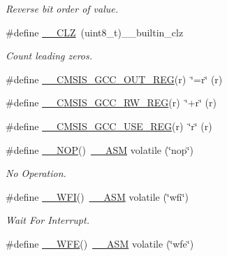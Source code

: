 \begin{DoxyCompactItemize}
\begin{DoxyCompactList}\small\item\em Reverse bit order of value. \end{DoxyCompactList}\item 
\#define \mbox{\hyperlink{group___c_m_s_i_s___core___instruction_interface_ga5d5bb1527e042be4a9fa5a33f65cc248}{\+\_\+\+\_\+\+C\+LZ}}~(uint8\+\_\+t)\+\_\+\+\_\+builtin\+\_\+clz
\begin{DoxyCompactList}\small\item\em Count leading zeros. \end{DoxyCompactList}\item 
\#define \mbox{\hyperlink{group___c_m_s_i_s___core___instruction_interface_gabc17e391c13c71702366c67cba39c276}{\+\_\+\+\_\+\+C\+M\+S\+I\+S\+\_\+\+G\+C\+C\+\_\+\+O\+U\+T\+\_\+\+R\+EG}}(r)~\char`\"{}=r\char`\"{} (r)
\item 
\#define \mbox{\hyperlink{group___c_m_s_i_s___core___instruction_interface_ga03179f79efee45c226dddfb8d824ad83}{\+\_\+\+\_\+\+C\+M\+S\+I\+S\+\_\+\+G\+C\+C\+\_\+\+R\+W\+\_\+\+R\+EG}}(r)~\char`\"{}+r\char`\"{} (r)
\item 
\#define \mbox{\hyperlink{group___c_m_s_i_s___core___instruction_interface_ga9d94dee7402367961d2cf0accc00fd97}{\+\_\+\+\_\+\+C\+M\+S\+I\+S\+\_\+\+G\+C\+C\+\_\+\+U\+S\+E\+\_\+\+R\+EG}}(r)~\char`\"{}r\char`\"{} (r)
\item 
\#define \mbox{\hyperlink{group___c_m_s_i_s___core___instruction_interface_ga0b13f3617dd4af2cd2eb3a311073f717}{\+\_\+\+\_\+\+N\+OP}}()~\mbox{\hyperlink{cmsis__iccarm_8h_a1378040bcf22428955c6e3ce9c2053cd}{\+\_\+\+\_\+\+A\+SM}} volatile (\char`\"{}nop\char`\"{})
\begin{DoxyCompactList}\small\item\em No Operation. \end{DoxyCompactList}\item 
\#define \mbox{\hyperlink{group___c_m_s_i_s___core___instruction_interface_gab28e2b328c4cf23c917ab18a23194f8e}{\+\_\+\+\_\+\+W\+FI}}()~\mbox{\hyperlink{cmsis__iccarm_8h_a1378040bcf22428955c6e3ce9c2053cd}{\+\_\+\+\_\+\+A\+SM}} volatile (\char`\"{}wfi\char`\"{})
\begin{DoxyCompactList}\small\item\em Wait For Interrupt. \end{DoxyCompactList}\item 
\#define \mbox{\hyperlink{group___c_m_s_i_s___core___instruction_interface_gaf0330712223f4cfb6091e4ab84775f73}{\+\_\+\+\_\+\+W\+FE}}()~\mbox{\hyperlink{cmsis__iccarm_8h_a1378040bcf22428955c6e3ce9c2053cd}{\+\_\+\+\_\+\+A\+SM}} volatile (\char`\"{}wfe\char`\"{})

\end{DoxyCompactItemize}
